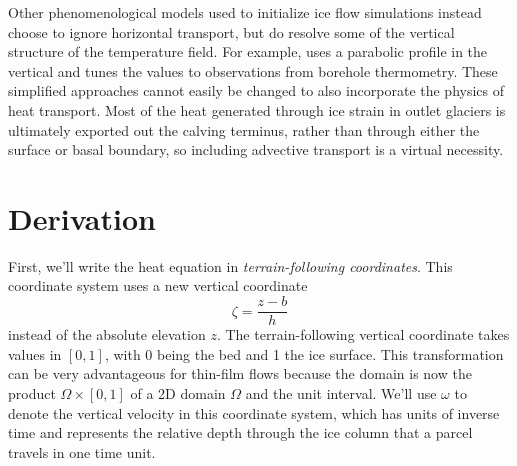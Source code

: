 \documentclass{article}
\theoremstyle{definition}
\theoremstyle{plain}
\begin{document}
Other phenomenological models used to initialize ice flow simulations instead choose to ignore horizontal transport, but do resolve some of the vertical structure of the temperature field.
For example, \citet{humbert2005parameter} uses a parabolic profile in the vertical and tunes the values to observations from borehole thermometry.
These simplified approaches cannot easily be changed to also incorporate the physics of heat transport.
Most of the heat generated through ice strain in outlet glaciers is ultimately exported out the calving terminus, rather than through either the surface or basal boundary, so including advective transport is a virtual necessity.


\section{Derivation}

First, we'll write the heat equation in \emph{terrain-following coordinates}.
This coordinate system uses a new vertical coordinate
\begin{equation}
    \zeta = \frac{z - b}{h}
\end{equation}
instead of the absolute elevation $z$.
The terrain-following vertical coordinate takes values in $[0, 1]$, with 0 being the bed and 1 the ice surface.
This transformation can be very advantageous for thin-film flows because the domain is now the product $\Omega \times [0, 1]$ of a 2D domain $\Omega$ and the unit interval.
We'll use $\omega$ to denote the vertical velocity in this coordinate system, which has units of inverse time and represents the relative depth through the ice column that a parcel travels in one time unit.
\end{document}
